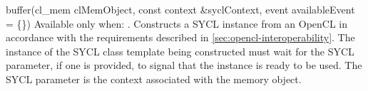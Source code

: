     \addRowThreeSL
      { buffer(cl_mem clMemObject, }
      { const context \&syclContext, }
      { event availableEvent = \{\}) }
      {
        Available only when: .
        \newline
        Constructs a SYCL  instance from an OpenCL  in accordance with the requirements described in \ref{sec:opencl-interoperability}.
        The instance of the SYCL  class template being constructed must wait for the SYCL  parameter, if one is provided,  to signal that the  instance is ready to be used.
        The SYCL  parameter  is the context associated with the memory object.
      } 
\completeInfoTable

